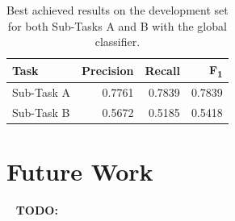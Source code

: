 \documentclass[11pt,a4paper]{article}
\begin{document}
\begin{table}[!h]
\begin{center}
\begin{tabular}{|l|r|r|r|}
\hline\centering\textbf{Task}  & \textbf{Precision} &  \textbf{Recall} &  \textbf{F\textsubscript{1}}\\
\hline
 Sub-Task A   &  0.7761 & 0.7839 & 0.7839 \\
 Sub-Task B   &  0.5672 & 0.5185 & 0.5418 \\
\hline
\end{tabular}
\end{center}
\caption{\label{devset-results} Best achieved results on the development set for both Sub-Tasks A and B with the global classifier.}
\end{table}










\section{Future Work}\label{future}

\ \newline
\textbf{TODO:}
\ \newline
\end{document}
